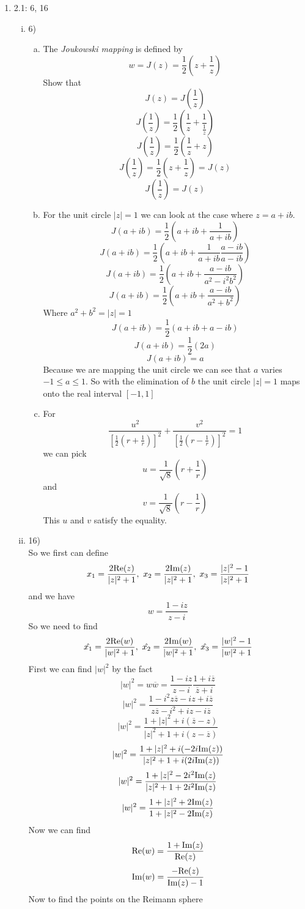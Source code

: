 \documentclass[11pt]{article}
\begin{document}
\begin{enumerate}
\item 2.1: 6, 16
\begin{enumerate}[(i)]

\item 6)
\begin{enumerate}[(a)]
\item The \emph{Joukowski mapping} is defined by
$$w = J(z) = \frac{1}{2}\left(z + \frac{1}{z}\right)$$
Show that $$J(z) = J(\frac{1}{z})$$
$$J\left(\frac{1}{z}\right) = \frac{1}{2}\left(\frac{1}{z} + \frac{1}{\frac{1}{z}}\right)$$
$$J\left(\frac{1}{z}\right) = \frac{1}{2}\left(\frac{1}{z} + z\right)$$
$$J\left(\frac{1}{z}\right) = \frac{1}{2}\left(z+\frac{1}{z}\right) = J(z)$$
$$J\left(\frac{1}{z}\right) = J(z)$$

\item
For the unit circle $|z| = 1$ we can look at the case where $z = a+ib$. 
$$J(a+ib) = \frac{1}{2}\left(a+ib + \frac{1}{a+ib}\right)$$
$$J(a+ib) = \frac{1}{2}\left(a+ib + \frac{1}{a+ib}\frac{a-ib}{a-ib}\right)$$
$$J(a+ib) = \frac{1}{2}\left(a+ib + \frac{a-ib}{a^2-i^2b^2}\right)$$
$$J(a+ib) = \frac{1}{2}\left(a+ib + \frac{a-ib}{a^2+b^2}\right)$$
Where $a^2+b^2 = |z| = 1$ 
$$J(a+ib) = \frac{1}{2}\left(a+ib + a-ib\right)$$
$$J(a+ib) = \frac{1}{2}\left(2a\right)$$
$$J(a+ib) = a$$
Because we are mapping the unit circle we can see that $a$ varies $-1 \le a \le 1$. So with the elimination of $b$ the unit circle $|z|=1$ maps onto the real interval $[-1,1]$

\item 
For
$$\frac{u^2}{\left[\frac{1}{2}\left(r+\frac{1}{r}\right)\right]^2}+\frac{v^2}{\left[\frac{1}{2}\left(r-\frac{1}{r}\right)\right]^2} = 1$$
we can pick 
$$u = \frac{1}{\sqrt{8}}\left(r+\frac{1}{r}\right)$$
and
$$v = \frac{1}{\sqrt{8}}\left(r-\frac{1}{r}\right)$$
This $u$ and $v$ satisfy the equality.
\end{enumerate}

\item 16)\\
So we first can define 
$$x_1 = \frac{2 \textnormal{Re}(z)}{|z|^2 +1},\ x_2=\frac{2 \textnormal{Im}(z)}{|z|^2 +1},\ x_3 = \frac{|z|^2 -1}{|z|^2 +1}$$
and we have 
$$w = \frac{1-iz}{z-i}$$
So we need to find
$$\hat{x_1} = \frac{2 \textnormal{Re}(w)}{|w|^2 +1},\ \hat{x_2}=\frac{2 \textnormal{Im}(w)}{|w|^2 +1},\ \hat{x_3} = \frac{|w|^2 -1}{|w|^2 +1}$$
First we can find $|w|^2$ by the fact
$$|w|^2 = w\overline{w} = \frac{1-iz}{z-i}\frac{1+i\overline{z}}{\overline{z}+i}$$
$$|w|^2 = \frac{1-i^2z\overline{z} -iz+i\overline{z}}{z\overline{z}-i^2+iz-i\overline{z}}$$
$$|w|^2 = \frac{1+|z|^2 +i(\overline{z}-z)}{|z|^2+1+i(z-\overline{z})}$$
$$|w|^2 = \frac{1+|z|^2 +i(-2i\textnormal{Im}(z))}{|z|^2+1+i(2i\textnormal{Im}(z))}$$
$$|w|^2 = \frac{1+|z|^2 -2i^2\textnormal{Im}(z)}{|z|^2+1+2i^2\textnormal{Im}(z)}$$
$$|w|^2 = \frac{1+|z|^2 +2\textnormal{Im}(z)}{1+|z|^2-2\textnormal{Im}(z)}$$
Now we can find 
$$\textnormal{Re}(w) = \frac{1+\textnormal{Im}(z)}{\textnormal{Re}(z)}$$
$$\textnormal{Im}(w) = \frac{-\textnormal{Re}(z)}{\textnormal{Im}(z)-1}$$
Now to find the points on the Reimann sphere


\end{enumerate}
\end{enumerate}
\end{document}
